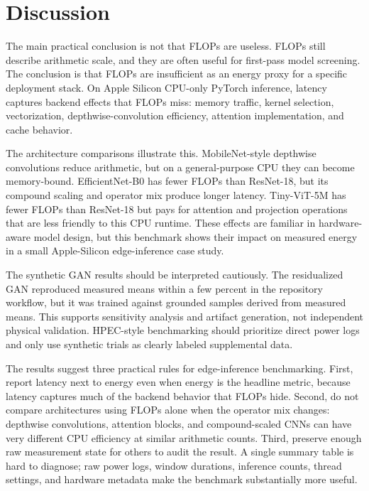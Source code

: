 \documentclass[conference]{IEEEtran}
\begin{document}
\section{Discussion}

The main practical conclusion is not that FLOPs are useless. FLOPs still
describe arithmetic scale, and they are often useful for first-pass model
screening. The conclusion is that FLOPs are insufficient as an energy proxy
for a specific deployment stack. On Apple Silicon CPU-only PyTorch inference,
latency captures backend effects that FLOPs miss: memory traffic, kernel
selection, vectorization, depthwise-convolution efficiency, attention
implementation, and cache behavior.

The architecture comparisons illustrate this. MobileNet-style depthwise
convolutions reduce arithmetic, but on a general-purpose CPU they can become
memory-bound. EfficientNet-B0 has fewer FLOPs than ResNet-18, but its compound
scaling and operator mix produce longer latency. Tiny-ViT-5M has fewer FLOPs
than ResNet-18 but pays for attention and projection operations that are less
friendly to this CPU runtime. These effects are familiar in hardware-aware
model design, but this benchmark shows their impact on measured energy in a
small Apple-Silicon edge-inference case study.

The synthetic GAN results should be interpreted cautiously. The residualized
GAN reproduced measured means within a few percent in the repository workflow,
but it was trained against grounded samples derived from measured means. This
supports sensitivity analysis and artifact generation, not independent
physical validation. HPEC-style benchmarking should prioritize direct power
logs and only use synthetic trials as clearly labeled supplemental data.

The results suggest three practical rules for edge-inference benchmarking.
First, report latency next to energy even when energy is the headline metric,
because latency captures much of the backend behavior that FLOPs hide. Second,
do not compare architectures using FLOPs alone when the operator mix changes:
depthwise convolutions, attention blocks, and compound-scaled CNNs can have
very different CPU efficiency at similar arithmetic counts. Third, preserve
enough raw measurement state for others to audit the result. A single summary
table is hard to diagnose; raw power logs, window durations, inference counts,
thread settings, and hardware metadata make the benchmark substantially more
useful.
\end{document}
